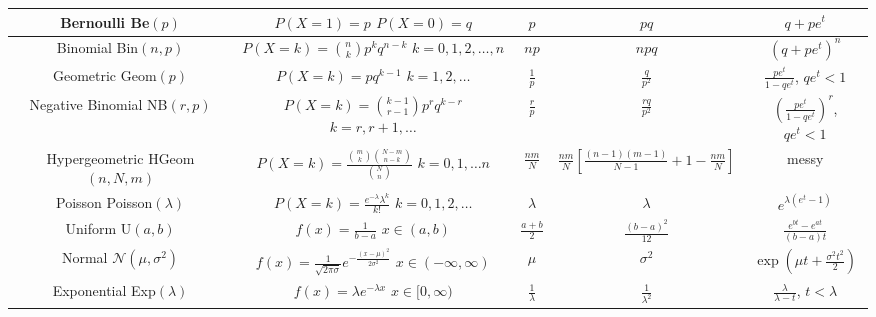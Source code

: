 \documentclass{article}
\begin{document}
\begin{center}
\begin{tabular}{c|c|c|c|c}
\makecell{Bernoulli \\ Be$(p)$} & \makecell{$P(X=1) = p$\\ $P(X=0)=q$} & $p$ & $pq$ & $q+pe^t$\\
\hline
\makecell{Binomial \\ Bin$(n,p)$} & \makecell{$P(X=k) = {n \choose k}p^kq^{n-k}$ \\ $k=0,1,2,\dots, n$} & $np$ & $npq$ & $(q+pe^t)^n$\\
\hline
\makecell{Geometric \\ Geom$(p)$} & \makecell{$P(X=k) = pq^{k-1}$ \\ $k=1,2,\dots$} & $\frac{1}{p}$ & $\frac{q}{p^2}$ &\makecell{$\frac{pe^t}{1-qe^t}$, \\ $qe^t<1$}\\
\hline
\makecell{Negative Binomial \\ NB$(r,p)$} & \makecell{$P(X=k) = {k-1 \choose r-1}p^rq^{k-r}$ \\ $k=r,r+1,\dots$} & $\frac{r}{p}$ & $\frac{rq}{p^2}$ & \makecell{$\left(\frac{pe^t}{1-qe^t}\right)^r$, \\ $qe^t<1$}\\
\hline
\makecell{Hypergeometric \\ HGeom$(n,N,m)$} & \makecell{$P(X=k) = \frac{{m \choose k}{N-m \choose n-k}}{{N\choose n}}$ \\ $k=0,1,\dots n$} & $\frac{nm}{N}$ & $\frac{nm}{N}\left[\frac{(n-1)(m-1)}{N-1} + 1 - \frac{nm}{N}\right] $ & messy \\
\hline
\makecell{Poisson \\ Poisson$(\lambda)$} & \makecell{$P(X=k) = \frac{e^{-\lambda}\lambda^k}{k!}$ \\ $k=0,1,2,\dots$} & $\lambda$ & $\lambda$ & $e^{\lambda(e^t-1)}$\\
\hline
\hline
\makecell{Uniform \\ U$(a,b)$} & \makecell{$f(x)=\frac{1}{b-a}$ \\ $x \in (a,b)$} & $\frac{a+b}{2}$ & $\frac{(b-a)^2}{12}$ & $\frac{e^{bt}-e^{at}}{(b-a)t}$\\
\hline
\makecell{Normal \\ $\mathcal{N}(\mu,\sigma^2)$} & \makecell{$f(x) = \frac{1}{\sqrt{2\pi\sigma}} e^{-\frac{(x-\mu)^2}{2\sigma^2}}$ \\ $x \in (-\infty,\infty)$} & $\mu$ & $\sigma^2$ & $\exp\left( \mu t+ \frac{\sigma^2t^2}{2}\right)$\\
\hline
\makecell{Exponential \\ Exp$(\lambda)$} & \makecell{$f(x) = \lambda e^{-\lambda x}$ \\ $x \in [0,\infty)$} & $\frac{1}{\lambda}$ & $\frac{1}{\lambda^2}$ & \makecell{$\frac{\lambda}{\lambda-t}$,\\ $t < \lambda$}\\

\end{tabular}
\end{center}
\end{document}
